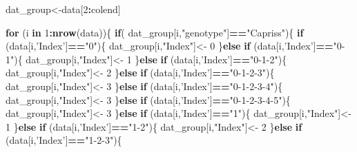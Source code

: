 \documentclass[]{article}
\newenvironment{Shaded}{\begin{snugshade}}{\end{snugshade}}
\newcommand{\KeywordTok}[1]{\textcolor[rgb]{0.13,0.29,0.53}{\textbf{#1}}}
\newcommand{\DecValTok}[1]{\textcolor[rgb]{0.00,0.00,0.81}{#1}}
\newcommand{\StringTok}[1]{\textcolor[rgb]{0.31,0.60,0.02}{#1}}
\newcommand{\ControlFlowTok}[1]{\textcolor[rgb]{0.13,0.29,0.53}{\textbf{#1}}}
\newcommand{\OperatorTok}[1]{\textcolor[rgb]{0.81,0.36,0.00}{\textbf{#1}}}
\newcommand{\NormalTok}[1]{#1}
\begin{document}
\begin{Shaded}
\begin{Highlighting}[]
\NormalTok{dat_group<-data[}\DecValTok{2}\OperatorTok{:}\NormalTok{colend]}



\ControlFlowTok{for}\NormalTok{ (i }\ControlFlowTok{in} \DecValTok{1}\OperatorTok{:}\KeywordTok{nrow}\NormalTok{(data))\{}
  \ControlFlowTok{if}\NormalTok{( dat_group[i,}\StringTok{"genotype"}\NormalTok{]}\OperatorTok{==}\StringTok{"Capriss"}\NormalTok{)\{}
    \ControlFlowTok{if}\NormalTok{ (data[i,}\StringTok{'Index'}\NormalTok{]}\OperatorTok{==}\StringTok{"0"}\NormalTok{)\{ }
\NormalTok{      dat_group[i,}\StringTok{"Index"}\NormalTok{]<-}\StringTok{ }\DecValTok{0}
\NormalTok{      \}}\ControlFlowTok{else} \ControlFlowTok{if}\NormalTok{ (data[i,}\StringTok{'Index'}\NormalTok{]}\OperatorTok{==}\StringTok{"0-1"}\NormalTok{)\{}
\NormalTok{      dat_group[i,}\StringTok{"Index"}\NormalTok{]<-}\StringTok{ }\DecValTok{1}
\NormalTok{      \}}\ControlFlowTok{else} \ControlFlowTok{if}\NormalTok{ (data[i,}\StringTok{'Index'}\NormalTok{]}\OperatorTok{==}\StringTok{"0-1-2"}\NormalTok{)\{}
\NormalTok{        dat_group[i,}\StringTok{"Index"}\NormalTok{]<-}\StringTok{ }\DecValTok{2}
\NormalTok{      \}}\ControlFlowTok{else} \ControlFlowTok{if}\NormalTok{ (data[i,}\StringTok{'Index'}\NormalTok{]}\OperatorTok{==}\StringTok{"0-1-2-3"}\NormalTok{)\{}
\NormalTok{        dat_group[i,}\StringTok{"Index"}\NormalTok{]<-}\StringTok{ }\DecValTok{3}
\NormalTok{      \}}\ControlFlowTok{else} \ControlFlowTok{if}\NormalTok{ (data[i,}\StringTok{'Index'}\NormalTok{]}\OperatorTok{==}\StringTok{"0-1-2-3-4"}\NormalTok{)\{}
\NormalTok{        dat_group[i,}\StringTok{"Index"}\NormalTok{]<-}\StringTok{ }\DecValTok{3}
\NormalTok{      \}}\ControlFlowTok{else} \ControlFlowTok{if}\NormalTok{ (data[i,}\StringTok{'Index'}\NormalTok{]}\OperatorTok{==}\StringTok{"0-1-2-3-4-5"}\NormalTok{)\{}
\NormalTok{        dat_group[i,}\StringTok{"Index"}\NormalTok{]<-}\StringTok{ }\DecValTok{3}
\NormalTok{      \}}\ControlFlowTok{else} \ControlFlowTok{if}\NormalTok{ (data[i,}\StringTok{'Index'}\NormalTok{]}\OperatorTok{==}\StringTok{"1"}\NormalTok{)\{}
\NormalTok{        dat_group[i,}\StringTok{"Index"}\NormalTok{]<-}\StringTok{ }\DecValTok{1}
\NormalTok{      \}}\ControlFlowTok{else} \ControlFlowTok{if}\NormalTok{ (data[i,}\StringTok{'Index'}\NormalTok{]}\OperatorTok{==}\StringTok{"1-2"}\NormalTok{)\{}
\NormalTok{        dat_group[i,}\StringTok{"Index"}\NormalTok{]<-}\StringTok{ }\DecValTok{2}
\NormalTok{      \}}\ControlFlowTok{else} \ControlFlowTok{if}\NormalTok{ (data[i,}\StringTok{'Index'}\NormalTok{]}\OperatorTok{==}\StringTok{"1-2-3"}\NormalTok{)\{}

\end{Highlighting}
\end{Shaded}
\end{document}
